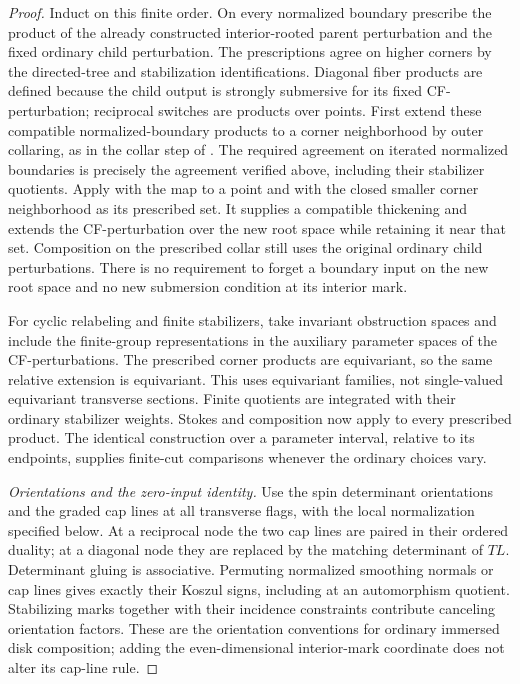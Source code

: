 \documentclass[11pt]{article}
\numberwithin{equation}{section}
\theoremstyle{definition}
\theoremstyle{remark}
\begin{document}
\begin{proof}
Induct on this finite order.  On every normalized boundary prescribe
the product of the already constructed interior-rooted parent
perturbation and the fixed ordinary child perturbation.  The
prescriptions agree on higher corners by the directed-tree and
stabilization identifications.  Diagonal fiber products are defined
because the child output is strongly submersive for its fixed
CF-perturbation; reciprocal switches are products over points.
First extend these compatible normalized-boundary products to a
corner neighborhood by outer collaring, as in the collar step of
\cite[Proposition~14.8 and Remark~14.7]{Floer:AFOOO2026}.  The required
agreement on iterated normalized boundaries is precisely the
agreement verified above, including their stabilizer quotients.
Apply \cite[Proposition~14.5]{Floer:AFOOO2026} with the map to a point
and with the closed smaller corner neighborhood as its prescribed
set.  It supplies a compatible thickening and extends the
CF-perturbation over the new root space while retaining it near
that set.  Composition on the prescribed collar still uses the
original ordinary child perturbations.  There is no requirement
to forget a boundary input on the new root space and no new
submersion condition at its interior mark.

For cyclic relabeling and finite stabilizers, take invariant
obstruction spaces and include the finite-group representations in
the auxiliary parameter spaces of the CF-perturbations.  The
prescribed corner products are equivariant, so the same relative
extension is equivariant.  This uses equivariant families, not
single-valued equivariant transverse sections.  Finite quotients
are integrated with their ordinary stabilizer weights.  Stokes and
composition now apply to every prescribed product.  The identical
construction over a parameter interval, relative to its endpoints,
supplies finite-cut comparisons whenever the ordinary choices vary.

\emph{Orientations and the zero-input identity.}
Use the spin determinant orientations and the graded cap lines at
all transverse flags, with the local normalization specified below.
At a reciprocal node the two cap lines are paired in their ordered duality; at a diagonal node they are
replaced by the matching determinant of $TL$.  Determinant gluing
is associative.  Permuting normalized smoothing normals or cap
lines gives exactly their Koszul signs, including at an
automorphism quotient.  Stabilizing marks together with their
incidence constraints contribute canceling orientation factors.
These are the orientation conventions for ordinary immersed disk
composition; adding the even-dimensional interior-mark coordinate
does not alter its cap-line rule.


\end{proof}
\end{document}
